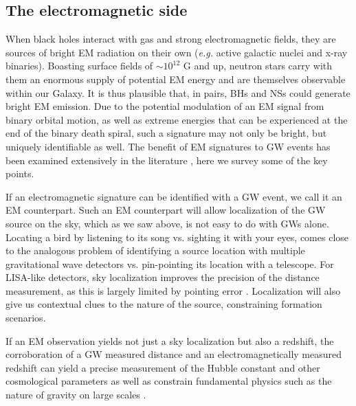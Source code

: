 \subsection{The electromagnetic side}  
When black holes interact with gas and strong electromagnetic fields, they are
sources of bright EM radiation on their own (\textit{e.g.} active galactic
nuclei and x-ray binaries). Boasting surface fields of $\sim 10^{12}$ G and
up, neutron stars carry with them an enormous supply of potential EM energy
and are themselves observable within our Galaxy. It is thus plausible that, in
pairs, BHs and NSs could generate bright EM emission. Due to the potential
modulation of an EM signal from binary orbital motion, as well as extreme
energies that can be experienced at the end of the binary death spiral, such a
signature may not only be bright, but uniquely identifiable as well. The
benefit of EM signatures to GW events has been examined extensively in the
literature \citep[\textit{e.g.}][]{Bloom:EMWP:2009}, here we survey some of the key points.

If an electromagnetic signature can be identified with a GW event, we call it
an EM counterpart. Such an EM counterpart will allow localization of the GW
source on the sky, which as we saw above, is not easy to do with GWs alone.
Locating a bird by listening to its song vs. sighting it with your eyes, comes
close to the analogous problem of identifying a source location with multiple
gravitational wave detectors vs. pin-pointing its location with a telescope.
For LISA-like detectors, sky localization improves the
precision of the distance measurement, as this is largely limited by pointing
error \citep{Cutler:1998, Hughes:2002}. Localization will also give us contextual
clues to the nature of the source, constraining formation scenarios.


If an EM observation yields not just a sky localization but also a redshift,
the corroboration of a GW measured distance and an electromagnetically
measured redshift can yield a precise measurement of the Hubble constant and
other cosmological parameters \citep{Schutz:1986, KrolakSchutz:1987,
ChernoffFinn:1993, Schutz:2002, HolzHughes:2005, Dalal:2006, Kocsis+2006,
Kocsis+2008, CutlerHolz:2009,  Nissanke:GRBStndSirens:2010, ShangHaiman:2011, Nishizawa:StndSirens:2011, Taylor:StndSirens:2012,
Tamanini:2016} as well as constrain fundamental physics such as the nature of
gravity on large scales \citep{Deffayet:2007, Camera:StndSirens:2013}.

